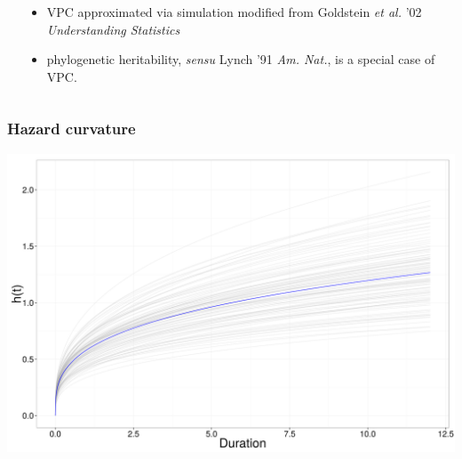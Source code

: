 \documentclass{beamer}
\begin{document}
\begin{frame}
\begin{columns}
\begin{column}{0.5\textwidth}
\begin{center}
      \end{center}
    \end{column}
    \begin{column}{0.5\textwidth}
      \begin{itemize}
        \item VPC approximated via simulation modified from Goldstein \textit{et al.} '02 \textit{Understanding Statistics}
        \item phylogenetic heritability, \textit{sensu} Lynch '91 \textit{Am. Nat.}, is a special case of VPC.
      \end{itemize}
    \end{column}
  \end{columns}
\end{frame}

\begin{frame}
  \frametitle{Hazard curvature}
  \begin{center}
    \includegraphics[height = 0.8\textheight, width = \textwidth,  keepaspectratio = true]{figure/haz_est}
  \end{center}
\end{frame}
\end{document}
